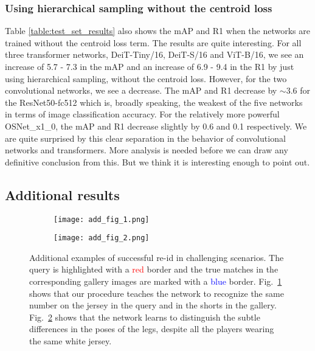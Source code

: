 \documentclass{article}
\begin{document}
\subsubsection{Using hierarchical sampling without the centroid loss}

Table \ref{table:test_set_results} also shows the mAP and R1 when the networks are trained without the centroid loss term. The results are quite interesting. For all three transformer networks, DeiT-Tiny/16, DeiT-S/16 and ViT-B/16, we see an increase of 5.7 - 7.3 in the mAP and an increase of 6.9 - 9.4 in the R1 by just using hierarchical sampling, without the centroid loss. However, for the two convolutional networks, we see a decrease. The mAP and R1 decrease by $\sim$3.6 for the ResNet50-fc512 which is, broadly speaking, the weakest of the five networks in terms of image classification accuracy. For the relatively more powerful OSNet\_x1\_0, the mAP and R1 decrease slightly by 0.6 and 0.1 respectively. We are quite surprised by this clear separation in the behavior of convolutional networks and transformers. More analysis is needed before we can draw any definitive conclusion from this. But we think it is interesting enough to point out.





    












\subsection{Additional results}

\begin{figure}[!ht]
\begin{subfigure}{0.48\textwidth}
         \centering
         \texttt{[image: add\_fig\_1.png]}
         \caption{}
         \label{fig:add_a}
     \end{subfigure}
     \hfill
    \begin{subfigure}{0.48\textwidth}
        \centering
        \texttt{[image: add\_fig\_2.png]}
        \caption{}
        \label{fig:add_b}
    \end{subfigure}
\caption{Additional examples of successful re-id in challenging scenarios. The query is highlighted with a \textcolor{red}{red} border and the true matches in the corresponding gallery images are marked with a \textcolor{blue}{blue} border. Fig.~\ref{fig:add_a} shows that our procedure teaches the network to recognize the same number on the jersey in the query and in the shorts in the gallery. Fig.~\ref{fig:add_b} shows that the network learns to distinguish the subtle differences in the poses of the legs, despite all the players wearing the same white jersey. 
}
    \label{fig:addfigures}
\end{figure}
\end{document}
